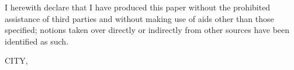 


\begin{declaration}        %

I herewith declare that I have produced this paper without the prohibited assistance of third parties and without making use of aids other than those specified; notions taken over directly or indirectly from other sources have been identified as such.


\vspace{10mm}

CITY,


\end{declaration}


